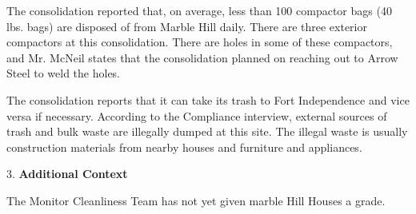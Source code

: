 The consolidation reported that, on average, less than 100 compactor bags (40 lbs. bags) are disposed of from Marble Hill daily. There are three exterior compactors at this consolidation. There are holes in some of these compactors, and Mr. McNeil states that the consolidation planned on reaching out to Arrow Steel to weld the holes. 

The consolidation reports that it can take its trash to Fort Independence and vice versa if necessary. According to the Compliance interview, external sources of trash and bulk waste are illegally dumped at this site. The illegal waste is usually construction materials from nearby houses and furniture and appliances.  

3. \textbf{Additional Context} 

The Monitor Cleanliness Team has not yet given marble Hill Houses a grade.